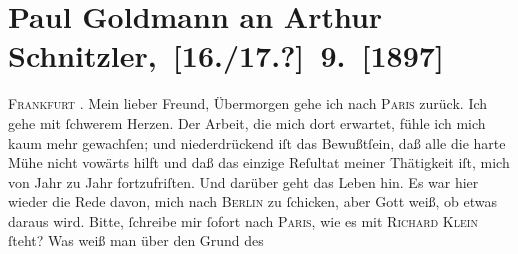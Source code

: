 

         
         \renewcommand{\erwaehntePersonen}{Personen: Berthold Frischauer, Paul Goldmann, Richard Klein, Arthur Klein, Johann Klein}
         \renewcommand{\erwaehnteOrte}{Orte: Berlin, Frankfurt am Main, Paris, Wien}
         \renewcommand{\erwaehnteWerke}{}
               \section[ Paul Goldmann an Arthur Schnitzler, {[}16./17.?{]} 9. {[}1897{]}]{ Paul Goldmann an Arthur Schnitzler, {[}16./17.?{]} 9. {[}1897{]}}\nopagebreak{}\rehead{ }\begin{ledgroupsized}[t]{13cm}\normalsize\beginnumbering \toendnotes[C]{\smallbreak\pagebreak[2]} 
\toendnotes[C]{\smallbreak}\pstart
           \raggedleft{}{\pb}\textsc{Frankfurt}{ }\label{K_L02824-1v}\label{K_L02824-1h}.\pend
           \pstart\center{}Mein lieber Freund,\pend\pstart
           Übermorgen gehe ich nach \textsc{Paris} zurück. Ich gehe mit ſchwerem Herzen. Der Arbeit, die mich dort erwartet, fühle
               ich mich kaum mehr gewachſen; und niederdrückend iſt das Bewußtſein, daß alle die
               harte Mühe nicht vowärts hilft und daß das einzige Reſultat meiner Thätigkeit iſt,
               mich von Jahr zu Jahr fortzufriſten. Und darüber geht das Leben  hin. Es war hier wieder die Rede davon, mich nach
                  \textsc{Berlin} zu ſchicken, aber Gott weiß, ob etwas daraus wird.\pend
           \pstart
           Bitte, ſchreibe mir ſofort nach \textsc{Paris}, wie es mit \textsc{Richard Klein} ſteht? Was weiß man {\pb}über den Grund des

\end{ledgroupsized}
